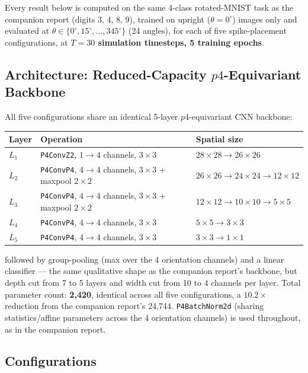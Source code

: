 \documentclass[11pt]{article}
\begin{document}
\begin{keypoint}
Every result below is computed on the same 4-class rotated-MNIST task as the companion report
(digits 3, 4, 8, 9), trained on upright ($\theta=0^\circ$) images only and evaluated at
$\theta \in \{0^\circ, 15^\circ, \ldots, 345^\circ\}$ (24 angles), for each of five spike-placement
configurations, at \textbf{$T=30$ simulation timesteps, 5 training epochs}.
\end{keypoint}

\subsection{Architecture: Reduced-Capacity $p4$-Equivariant Backbone}
\label{sec:arch}

All five configurations share an identical 5-layer $p4$-equivariant CNN backbone:

\begin{center}
\begin{tabular}{@{}lll@{}}
\toprule
Layer & Operation & Spatial size \\
\midrule
$L_1$ & \texttt{P4ConvZ2}, $1{\to}4$ channels, $3\times3$ & $28\times28 \to 26\times26$ \\
$L_2$ & \texttt{P4ConvP4}, $4{\to}4$ channels, $3\times3$ + maxpool $2\times2$ & $26\times26 \to 24\times24 \to 12\times12$ \\
$L_3$ & \texttt{P4ConvP4}, $4{\to}4$ channels, $3\times3$ + maxpool $2\times2$ & $12\times12 \to 10\times10 \to 5\times5$ \\
$L_4$ & \texttt{P4ConvP4}, $4{\to}4$ channels, $3\times3$ & $5\times5 \to 3\times3$ \\
$L_5$ & \texttt{P4ConvP4}, $4{\to}4$ channels, $3\times3$ & $3\times3 \to 1\times1$ \\
\bottomrule
\end{tabular}
\end{center}

followed by group-pooling (max over the 4 orientation channels) and a linear classifier --- the same
qualitative shape as the companion report's backbone, but depth cut from 7 to 5 layers and width cut
from 10 to 4 channels per layer. Total parameter count: \textbf{2{,}420}, identical across all five
configurations, a $10.2\times$ reduction from the companion report's 24{,}744. \texttt{P4BatchNorm2d}
(sharing statistics/affine parameters across the 4 orientation channels) is used throughout, as in the
companion report.

\subsection{Configurations}
\end{document}
